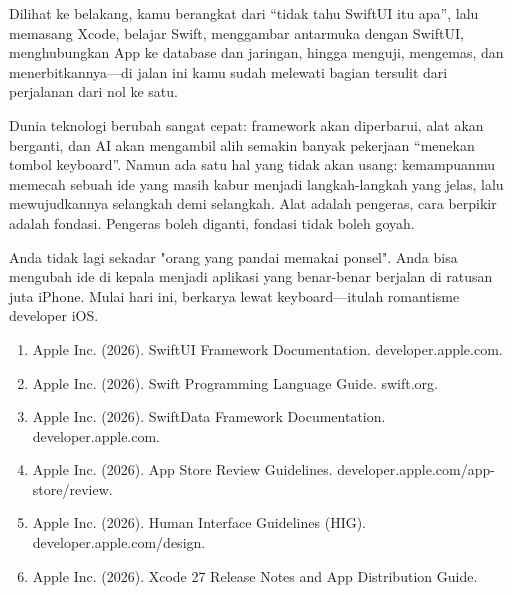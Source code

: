 
Dilihat ke belakang, kamu berangkat dari “tidak tahu SwiftUI itu apa”, lalu memasang Xcode, belajar Swift, menggambar antarmuka dengan SwiftUI, menghubungkan App ke database dan jaringan, hingga menguji, mengemas, dan menerbitkannya—di jalan ini kamu sudah melewati bagian tersulit dari perjalanan dari nol ke satu.

Dunia teknologi berubah sangat cepat: framework akan diperbarui, alat akan berganti, dan AI akan mengambil alih semakin banyak pekerjaan “menekan tombol keyboard”. Namun ada satu hal yang tidak akan usang: kemampuanmu memecah sebuah ide yang masih kabur menjadi langkah-langkah yang jelas, lalu mewujudkannya selangkah demi selangkah. Alat adalah pengeras, cara berpikir adalah fondasi. Pengeras boleh diganti, fondasi tidak boleh goyah.

Anda tidak lagi sekadar "orang yang pandai memakai ponsel". Anda bisa mengubah ide di kepala menjadi aplikasi yang benar-benar berjalan di ratusan juta iPhone. Mulai hari ini, berkarya lewat keyboard—itulah romantisme developer iOS.


\begin{enumerate}
  \item Apple Inc. (2026). SwiftUI Framework Documentation. developer.apple.com.
  \item Apple Inc. (2026). Swift Programming Language Guide. swift.org.
  \item Apple Inc. (2026). SwiftData Framework Documentation. developer.apple.com.
  \item Apple Inc. (2026). App Store Review Guidelines. developer.apple.com/app-store/review.
  \item Apple Inc. (2026). Human Interface Guidelines (HIG). developer.apple.com/design.
  \item Apple Inc. (2026). Xcode 27 Release Notes and App Distribution Guide.
\end{enumerate}
